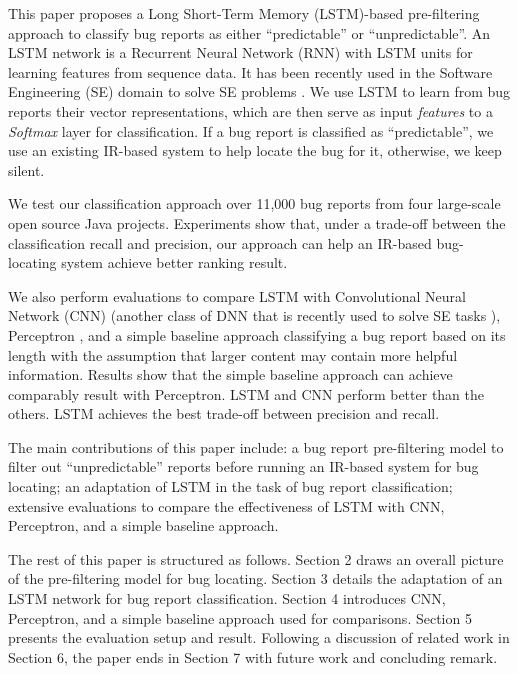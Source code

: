 This paper proposes a Long Short-Term Memory (LSTM)-based pre-filtering approach to classify bug reports as either ``predictable'' or ``unpredictable''. An LSTM network is a Recurrent Neural Network (RNN) with LSTM units \cite{Hochreiter:1997:LSM:1246443.1246450} for learning features from sequence data. It has been recently used in the Software Engineering (SE) domain to solve SE problems \cite{8255666, Huo:2017:EUF:3172077.3172153}. We use LSTM to learn from bug reports their vector representations, which are then serve as input \textit{features} to a \textit{Softmax} layer for classification. If a bug report is classified as ``predictable'', we use an existing IR-based system to help locate the bug for it, otherwise, we keep silent.

We test our classification approach over 11,000 bug reports from four large-scale open source Java projects. Experiments show that, under a trade-off between the classification recall and precision, our approach can help an IR-based bug-locating system achieve better ranking result.

We also perform evaluations to compare LSTM with Convolutional Neural Network (CNN) \cite{726791} (another class of DNN that is recently used to solve SE tasks \cite{Le:2015:IRS:2786805.2786880, Xu:2016:PSL:2970276.2970357, Mou:2016:CNN:3015812.3016002}), Perceptron \cite{Freund:1999:LMC:337859.337869, r-ppmisob-58}, and a simple baseline approach classifying a bug report based on its length with the assumption that larger content may contain more helpful information. Results show that the simple baseline approach can achieve comparably result with Perceptron. LSTM and CNN perform better than the others. LSTM achieves the best trade-off between precision and recall. 

The main contributions of this paper include: a bug report pre-filtering model to filter out ``unpredictable'' reports before running an IR-based system for bug locating; an adaptation of LSTM in the task of bug report classification; extensive evaluations to compare the effectiveness of LSTM with CNN, Perceptron, and a simple baseline approach.

The rest of this paper is structured as follows. Section 2 draws an overall picture of the pre-filtering model for bug locating. Section 3 details the adaptation of an LSTM network for bug report classification. Section 4 introduces CNN, Perceptron, and a simple baseline approach used for comparisons. Section 5 presents the evaluation setup and result. Following a discussion of related work in Section 6, the paper ends in Section 7 with future work and concluding remark.

